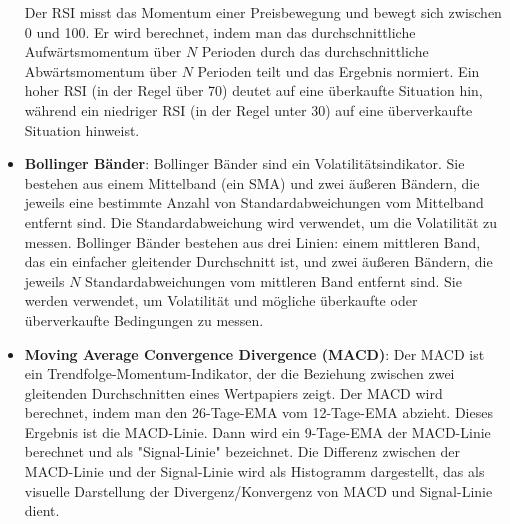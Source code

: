 \documentclass{article}
\begin{document}
\begin{itemize}
Der RSI misst das Momentum einer Preisbewegung und bewegt sich zwischen 0 und 100. Er wird berechnet, indem man das durchschnittliche Aufwärtsmomentum über $N$ Perioden durch das durchschnittliche Abwärtsmomentum über $N$ Perioden teilt und das Ergebnis normiert. Ein hoher RSI (in der Regel über 70) deutet auf eine überkaufte Situation hin, während ein niedriger RSI (in der Regel unter 30) auf eine überverkaufte Situation hinweist.

\item \textbf{Bollinger Bänder}: Bollinger Bänder sind ein Volatilitätsindikator. Sie bestehen aus einem Mittelband (ein SMA) und zwei äußeren Bändern, die jeweils eine bestimmte Anzahl von Standardabweichungen vom Mittelband entfernt sind. Die Standardabweichung wird verwendet, um die Volatilität zu messen.
Bollinger Bänder bestehen aus drei Linien: einem mittleren Band, das ein einfacher gleitender Durchschnitt ist, und zwei äußeren Bändern, die jeweils $N$ Standardabweichungen vom mittleren Band entfernt sind. Sie werden verwendet, um Volatilität und mögliche überkaufte oder überverkaufte Bedingungen zu messen.

\item \textbf{Moving Average Convergence Divergence (MACD)}: Der MACD ist ein Trendfolge-Momentum-Indikator, der die Beziehung zwischen zwei gleitenden Durchschnitten eines Wertpapiers zeigt. Der MACD wird berechnet, indem man den 26-Tage-EMA vom 12-Tage-EMA abzieht. Dieses Ergebnis ist die MACD-Linie. Dann wird ein 9-Tage-EMA der MACD-Linie berechnet und als "Signal-Linie" bezeichnet. Die Differenz zwischen der MACD-Linie und der Signal-Linie wird als Histogramm dargestellt, das als visuelle Darstellung der Divergenz/Konvergenz von MACD und Signal-Linie dient.

\end{itemize}
\end{document}
